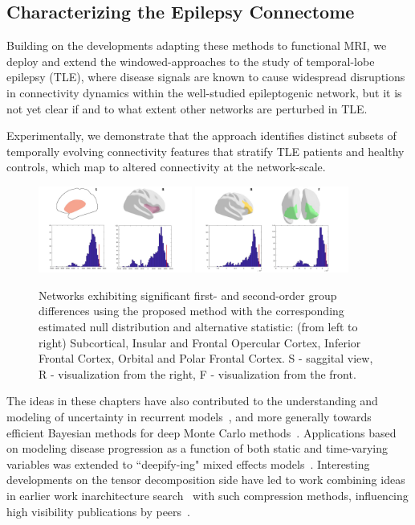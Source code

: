 \subsection{Characterizing the Epilepsy Connectome}
Building on the developments adapting these methods to functional MRI,
we deploy and extend the windowed-approaches
to the study of temporal-lobe epilepsy (TLE),
where disease signals are known to
cause widespread disruptions in connectivity dynamics within the well-studied epileptogenic network, 
but it is not yet clear if and to what extent other networks are perturbed in TLE.

Experimentally, we demonstrate that the approach identifies distinct subsets of temporally evolving connectivity features that stratify TLE patients and healthy controls, which map to altered connectivity at the network-scale. 

\begin{figure}
	\centering
	\includegraphics[width=0.45\textwidth, trim={2.5cm 0cm 3cm 0cm}]{7_conclude/figs/ProposedMethod_Results1.jpg}
	\includegraphics[width=0.45\textwidth, trim={2.5cm 0cm 4cm 0cm},clip]{7_conclude/figs/ProposedMethod_Results2.jpg}
	\caption[Differences in network connectivities in TLE populations]{Networks exhibiting significant first- and second-order group differences using the proposed method with the corresponding estimated null distribution and alternative statistic: (from left to right) Subcortical, Insular and Frontal Opercular Cortex, Inferior Frontal Cortex, Orbital and Polar Frontal Cortex. S - saggital view, R - visualization from the right, F - visualization from the front. \label{fig:CovTrajResults}}
\end{figure}

The ideas in these chapters have also contributed
to the understanding and modeling of uncertainty
in recurrent models~\citep{spgru},
and more generally towards efficient
Bayesian methods for deep Monte Carlo methods~\citep{mcreparam}.
Applications based on modeling disease progression
as a function of both static and time-varying 
variables was extended to ``deepify-ing" mixed effects models~\citep{deepmem}.
Interesting developments on the tensor decomposition side
have led to work combining ideas
in earlier work inarchitecture search~\citep{submodarch}
with such compression methods,
influencing high visibility publications by peers~\citep{xiong2021mobiledets}.

